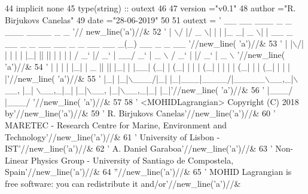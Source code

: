 \begin{DoxyCode}
44     \textcolor{keywordtype}{implicit none}
45     \textcolor{keywordtype}{type}(string) :: outext
46 
47     version  =\textcolor{stringliteral}{"v0.1"}
48     author   =\textcolor{stringliteral}{"R. Birjukovs Canelas"}
49     date     =\textcolor{stringliteral}{"28-06-2019"}
50 
51     outext = \textcolor{stringliteral}{' \_\_  \_\_  \_\_\_  \_   \_ \_\_\_ \_\_\_\_  \_                                      \_              '}//
      new\_line(\textcolor{stringliteral}{'a'})//&
52         \textcolor{stringliteral}{' |  \(\backslash\)/  |/ \_ \(\backslash\)| | | |\_ \_|  \_ \(\backslash\)| |    \_\_ \_  \_\_ \_ \_ \_\_ \_\_ \_ \_ \_\_   \_\_ \_(\_) \_\_ \_ \_ \_\_  '}//new\_line(\textcolor{stringliteral}{
      'a'})//&
53         \textcolor{stringliteral}{' | |\(\backslash\)/| | | | | |\_| || || | | | |   / \_` |/ \_` | \_\_/  \_` |  \_ \(\backslash\) / \_` | |/ \_` |  \_ \(\backslash\) '}//new\_line(\textcolor{stringliteral}{
      'a'})//&
54         \textcolor{stringliteral}{' | |  | | |\_| |  \_  || || |\_| | |\_\_| (\_| | (\_| | | | (\_| | | | | (\_| | | (\_| | | | |'}//new\_line(\textcolor{stringliteral}{
      'a'})//&
55         \textcolor{stringliteral}{' |\_|  |\_|\(\backslash\)\_\_\_/|\_| |\_|\_\_\_|\_\_\_\_/|\_\_\_\_\_\(\backslash\)\_\_,\_|\(\backslash\)\_\_, |\_|  \(\backslash\)\_\_,\_|\_| |\_|\(\backslash\)\_\_, |\_|\(\backslash\)\_\_,\_|\_| |\_|'}//new\_line(\textcolor{stringliteral}{
      'a'})//&
56         \textcolor{stringliteral}{'                                          |\_\_\_/                 |\_\_\_/               '}//new\_line(\textcolor{stringliteral}{
      'a'})//&
57 
58         \textcolor{stringliteral}{'  <MOHIDLagrangian> Copyright (C) 2018 by'}//new\_line(\textcolor{stringliteral}{'a'})//&
59         \textcolor{stringliteral}{'  R. Birjukovs Canelas'}//new\_line(\textcolor{stringliteral}{'a'})//&
60         \textcolor{stringliteral}{'  MARETEC - Research Centre for Marine, Environment and Technology'}//new\_line(\textcolor{stringliteral}{'a'})//&
61         \textcolor{stringliteral}{'  University of Lisbon - IST'}//new\_line(\textcolor{stringliteral}{'a'})//&
62         \textcolor{stringliteral}{'  A. Daniel Garaboa'}//new\_line(\textcolor{stringliteral}{'a'})//&
63         \textcolor{stringliteral}{'  Non-Linear Physics Group - University of Santiago de Compostela, Spain'}//new\_line(\textcolor{stringliteral}{'a'})//&
64         \textcolor{stringliteral}{''}//new\_line(\textcolor{stringliteral}{'a'})//&
65         \textcolor{stringliteral}{'  MOHID Lagrangian is free software: you can redistribute it and/or'}//new\_line(\textcolor{stringliteral}{'a'})//&

\end{DoxyCode}
